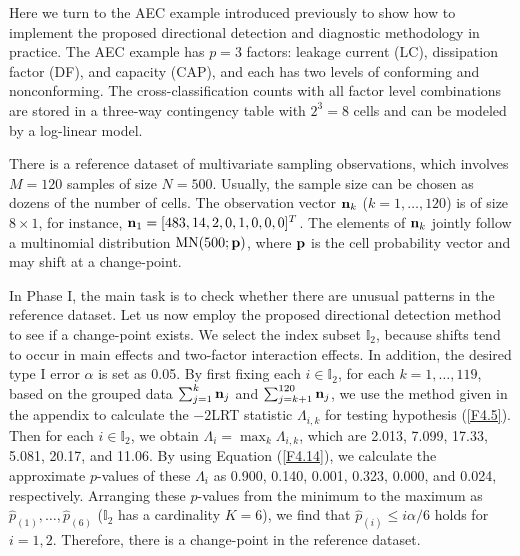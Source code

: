 Here we turn to the AEC example introduced previously to show how to implement the
proposed directional detection and diagnostic methodology in practice. The AEC
example has $p=3$ factors: leakage current (LC), dissipation factor (DF), and
capacity (CAP), and each has two levels of conforming and nonconforming. The
cross-classification counts with all factor level combinations are stored in a
three-way contingency table with $2^3=8$ cells and can be modeled by a log-linear
model.

There is a reference dataset of multivariate sampling observations, which involves
$M=120$ samples of size $N=500$. Usually, the sample size can be chosen as dozens of
the number of cells. The observation vector ${\bf n}_k$ ($k=1,\ldots,120$) is of
size $8\times 1$, for instance, ${\bf n}_1=[483,14,2,0,1,0,0,0]^T$. The elements of
${\bf n}_k$ jointly follow a multinomial distribution $\mbox{MN}(500;{\bf p})$,
where ${\bf p}$ is the cell probability vector and may shift at a change-point.

In Phase I, the main task is to check whether there are unusual patterns in the
reference dataset. Let us now employ the proposed directional detection method to
see if a change-point exists. We select the index subset $\mathbb{I}_2$, because
shifts tend to occur in main effects and two-factor interaction effects. In
addition, the desired type I error $\alpha$ is set as 0.05. By first fixing each
$i\in\mathbb{I}_2$, for each $k=1,\ldots,119$, based on the grouped data
$\sum_{j=1}^k{\bf n}_j$ and $\sum_{j=k+1}^{120}{\bf n}_j$, we use the method given
in the appendix to calculate the $-2$LRT statistic $\Lambda_{i,k}$ for testing
hypothesis (\ref{F4.5}). Then for each $i\in\mathbb{I}_2$, we obtain
$\Lambda_i=\max_k\Lambda_{i,k}$, which are 2.013, 7.099, 17.33, 5.081, 20.17, and
11.06. By using Equation (\ref{F4.14}), we calculate the approximate $p$-values of
these $\Lambda_i$ as 0.900, 0.140, 0.001, 0.323, 0.000, and 0.024, respectively.
Arranging these $p$-values from the minimum to the maximum as
$\hat{p}_{(1)},\ldots,\hat{p}_{(6)}$ ($\mathbb{I}_2$ has a cardinality $K=6$), we
find that $\hat{p}_{(i)}\leq i\alpha/6$ holds for $i=1,2$. Therefore, there is a
change-point in the reference dataset.

